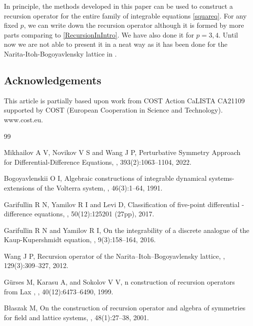 \documentclass[fleqn,11pt,twoside]{article}
\theoremstyle{definition}
\begin{document}
In principle, the methods developed in this paper can be used to construct a recursion operator for the entire family of integrable equations \eqref{squareq}. For any fixed $p$, we can write down the recursion operator although it is formed by more parts comparing to \eqref{RecursionInIntro}. We  have also done it for $p=3, 4$.  Until now we are not able to present it in a neat way as it has been done for the Narita-Itoh-Bogoyavlensky lattice in \cite{7}.

\subsection*{Acknowledgements}
This article is partially based upon work from COST Action CaLISTA CA21109 supported by COST (European Cooperation in Science and Technology). www.cost.eu.
\begin{thebibliography}{99}

Mikhailov A V, Novikov V S and Wang J P,
\newblock Perturbative {S}ymmetry {A}pproach for {D}ifferential-{D}ifference
  {E}quations,
, 393(2):1063–1104,
  2022.

Bogoyavlenskii O I,
\newblock Algebraic constructions of integrable dynamical systems-extensions of
  the {V}olterra system,
, 46(3):1--64, 1991.

Garifullin R N, Yamilov R I and Levi D,
\newblock Classification of five-point differential - difference equations,
,
  50(12):125201 (27pp), 2017.

Garifullin R N and Yamilov R I,
\newblock On the integrability of a discrete analogue of the
  {K}aup-{K}upershmidt equation,
, 9(3):158–164, 2016.

Wang J P,
\newblock Recursion operator of the {N}arita–{I}toh–{B}ogoyavlensky
  lattice,
, 129(3):309--327, 2012.

Gürses M, Karasu A, and Sokolov V V,
n construction of recursion operators from {L}ax ,
, 40(12):6473--6490, 1999.

B\l{}aszak M,
\newblock On the construction of recursion operator and algebra of symmetries
  for field and lattice systems,
, 48(1):27--38, 2001.


\end{thebibliography}
\end{document}
